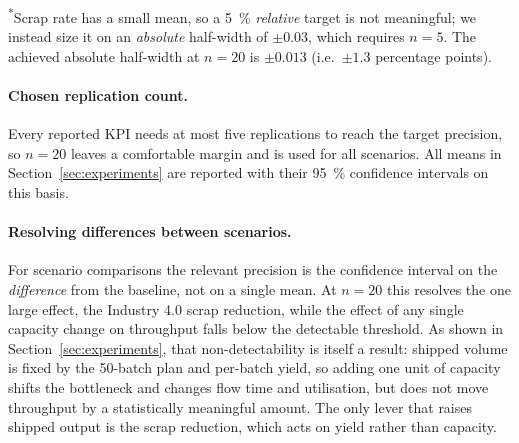 \noindent\textsuperscript{*}Scrap rate has a small mean, so a \SI{5}{\percent}
\emph{relative} target is not meaningful; we instead size it on an \emph{absolute}
half-width of $\pm 0.03$, which requires $n=5$. The achieved absolute half-width at
$n=20$ is $\pm 0.013$ (i.e.\ $\pm 1.3$ percentage points).

\paragraph{Chosen replication count.}
Every reported KPI needs at most five replications to reach the target precision, so
$n=20$ leaves a comfortable margin and is used for all scenarios. All means in
Section~\ref{sec:experiments} are reported with their \SI{95}{\percent} confidence
intervals on this basis.

\paragraph{Resolving differences between scenarios.}
For scenario comparisons the relevant precision is the confidence interval on the
\emph{difference} from the baseline, not on a single mean. At $n=20$ this resolves
the one large effect, the Industry 4.0 scrap reduction, while the effect of any
single capacity change on throughput falls below the detectable threshold. As
shown in Section~\ref{sec:experiments}, that non-detectability is itself a result:
shipped volume is fixed by the 50-batch plan and per-batch yield, so adding one unit
of capacity shifts the bottleneck and changes flow time and utilisation, but does not
move throughput by a statistically meaningful amount. The only lever that raises
shipped output is the scrap reduction, which acts on yield rather than capacity.

